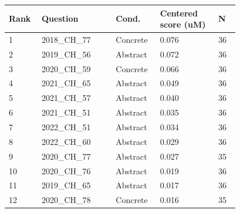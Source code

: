 \begin{tabular}{p{0.08\linewidth}p{0.28\linewidth}p{0.12\linewidth}p{0.22\linewidth}p{0.08\linewidth}}
\toprule
Rank & Question & Cond. & Centered score (uM) & N\\
\midrule
1 & 2018\_CH\_77 & Concrete & 0.076 & 36\\
2 & 2019\_CH\_56 & Abstract & 0.072 & 36\\
3 & 2020\_CH\_59 & Concrete & 0.066 & 36\\
4 & 2021\_CH\_65 & Abstract & 0.049 & 36\\
5 & 2021\_CH\_57 & Abstract & 0.040 & 36\\
6 & 2021\_CH\_51 & Abstract & 0.035 & 36\\
7 & 2022\_CH\_51 & Abstract & 0.034 & 36\\
8 & 2022\_CH\_60 & Abstract & 0.029 & 36\\
9 & 2020\_CH\_77 & Abstract & 0.027 & 35\\
10 & 2020\_CH\_76 & Abstract & 0.019 & 36\\
11 & 2019\_CH\_65 & Abstract & 0.017 & 36\\
12 & 2020\_CH\_78 & Concrete & 0.016 & 35\\
\bottomrule
\end{tabular}

